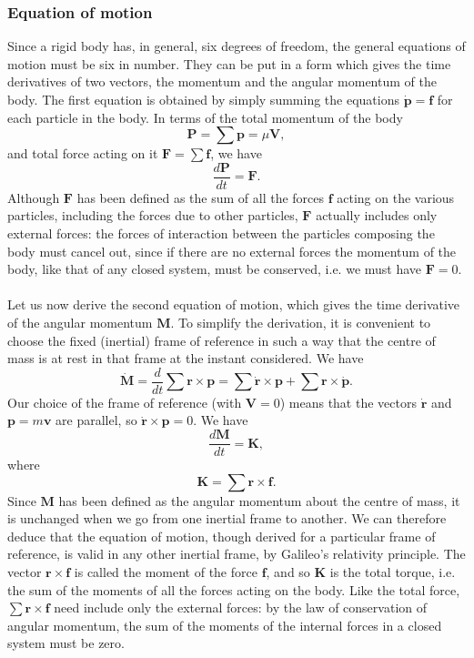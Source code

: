 \subsubsection{Equation of motion}
Since a rigid body has, in general, six degrees of freedom, the general equations of motion must be six in number. They can be put in a form which gives the time derivatives of two vectors, the momentum and the angular momentum of the body.
The first equation is obtained by simply summing the equations $\dot{\bm{p}} = \bm{f}$ for each particle in the body. In terms of the total momentum of the body
\[\bm{P} = \sum \bm{p} = \mu\bm{V}, \]
and total force acting on it $\bm{F} = \sum \bm{f}$, we have
\[\frac{d\bm{P}}{dt} = \bm{F} .\]
Although $\bm{F}$ has been defined as the sum of all the forces $\bm{f}$ acting on the various particles, including the forces due to other particles, $\bm{F}$ actually includes only external forces: the forces of interaction between the particles composing the body must cancel out, since if there are no external forces the momentum of the body, like that of any closed system, must be conserved, i.e. we must have $\bm{F} = 0$. 
\\ \\
Let us now derive the second equation of motion, which gives the time derivative of the angular momentum $\bm{M}$.
To simplify the derivation, it is convenient to choose the fixed (inertial) frame of reference in such a way that the centre of mass is at rest in that frame at the instant considered. We have
\[\dot{\bm{M}} = \frac{d}{dt} \sum \bm{r} \times \bm{p} = \sum \bm{\dot{r}} \times \bm{p} + \sum \bm{r} \times \dot{\bm{p}}.\]
Our choice of the frame of reference (with $\bm{V} = 0$) means that the vectors $\dot{\bm{r}}$ and $\bm{p} = m\bm{v}$ are parallel, so $\dot{\bm{r}} \times \bm{p} = 0$. We have
\[\frac{d\bm{M}}{dt} = \bm{K}, \]
where
\[\bm{K} = \sum \bm{r} \times \bm{f}.\]
Since $\bm{M}$ has been defined as the angular momentum about the centre of mass, it is unchanged when we go from one inertial frame to another. We can therefore deduce that the equation of motion, though derived for a particular frame of reference, is valid in any other inertial frame, by Galileo's relativity principle.
The vector $\bm{r}\times \bm{f}$ is called the moment of the force $\bm{f}$, and so $\bm{K}$ is the total torque, i.e. the sum of the moments of all the forces acting on the body. Like the total force, $\sum \bm{r} \times \bm{f}$ need include only the external forces: by the law of conservation of angular momentum, the sum of the moments of the internal forces in a closed system must be zero.

